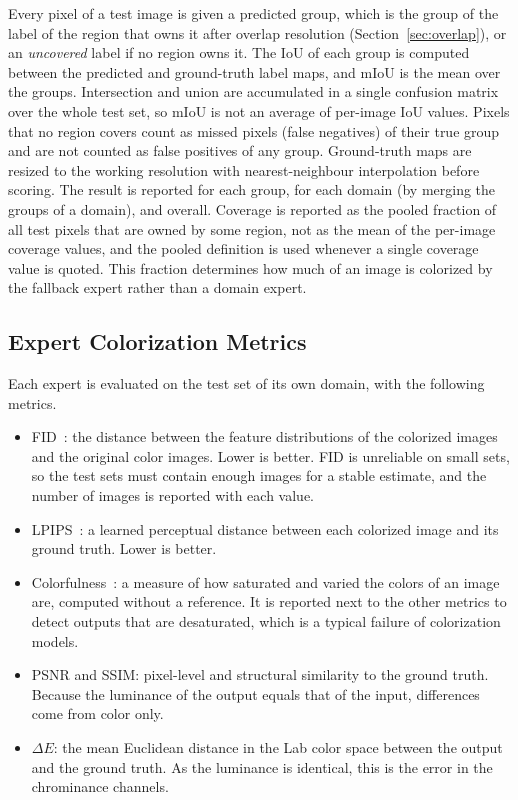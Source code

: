 \documentclass{FastFyp}
\begin{document}
Every pixel of a test image is given a predicted group, which is the group of the label of the region that owns it after overlap resolution (Section~\ref{sec:overlap}), or an \textit{uncovered} label if no region owns it. The IoU of each group is computed between the predicted and ground-truth label maps, and mIoU is the mean over the groups. Intersection and union are accumulated in a single confusion matrix over the whole test set, so mIoU is not an average of per-image IoU values. Pixels that no region covers count as missed pixels (false negatives) of their true group and are not counted as false positives of any group. Ground-truth maps are resized to the working resolution with nearest-neighbour interpolation before scoring. The result is reported for each group, for each domain (by merging the groups of a domain), and overall. Coverage is reported as the pooled fraction of all test pixels that are owned by some region, not as the mean of the per-image coverage values, and the pooled definition is used whenever a single coverage value is quoted. This fraction determines how much of an image is colorized by the fallback expert rather than a domain expert.

\subsection{Expert Colorization Metrics}
\label{sec:expert-metrics}
Each expert is evaluated on the test set of its own domain, with the following metrics.

\begin{itemize}
    \item FID~\cite{heusel2017fid}: the distance between the feature distributions of the colorized images and the original color images. Lower is better. FID is unreliable on small sets, so the test sets must contain enough images for a stable estimate, and the number of images is reported with each value.
    \item LPIPS~\cite{zhang2018lpips}: a learned perceptual distance between each colorized image and its ground truth. Lower is better.
    \item Colorfulness~\cite{hasler2003colorfulness}: a measure of how saturated and varied the colors of an image are, computed without a reference. It is reported next to the other metrics to detect outputs that are desaturated, which is a typical failure of colorization models.
    \item PSNR and SSIM: pixel-level and structural similarity to the ground truth. Because the luminance of the output equals that of the input, differences come from color only.
    \item $\Delta E$: the mean Euclidean distance in the Lab color space between the output and the ground truth. As the luminance is identical, this is the error in the chrominance channels.
\end{itemize}
\end{document}
